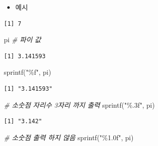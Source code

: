 \documentclass[
  11pt,
]{krantz}
\newenvironment{Shaded}{\begin{snugshade}}{\end{snugshade}}
\newcommand{\CommentTok}[1]{\textcolor[rgb]{0.37,0.37,0.37}{\textit{#1}}}
\newcommand{\FunctionTok}[1]{\textcolor[rgb]{0,0,0}{#1}}
\newcommand{\NormalTok}[1]{#1}
\newcommand{\SpecialCharTok}[1]{\textcolor[rgb]{0,0,0}{#1}}
\newcommand{\StringTok}[1]{\textcolor[rgb]{0.5,0.5,0.5}{#1}}
\providecommand{\tightlist}{%
  \setlength{\itemsep}{0pt}\setlength{\parskip}{0pt}}
\begin{document}
\normalsize

\begin{itemize}
\tightlist
\item
  예시
\end{itemize}

\footnotesize

\begin{Shaded}
\end{Shaded}

\begin{verbatim}
[1] 7
\end{verbatim}

\begin{Shaded}
\begin{Highlighting}[]
\NormalTok{pi }\CommentTok{\# 파이 값}
\end{Highlighting}
\end{Shaded}

\begin{verbatim}
[1] 3.141593
\end{verbatim}

\begin{Shaded}
\begin{Highlighting}[]
\FunctionTok{sprintf}\NormalTok{(}\StringTok{"\%f"}\NormalTok{, pi) }
\end{Highlighting}
\end{Shaded}

\begin{verbatim}
[1] "3.141593"
\end{verbatim}

\begin{Shaded}
\begin{Highlighting}[]
\CommentTok{\# 소숫점 자리수 3자리 까지 출력}
\FunctionTok{sprintf}\NormalTok{(}\StringTok{"\%.3f"}\NormalTok{, pi)}
\end{Highlighting}
\end{Shaded}

\begin{verbatim}
[1] "3.142"
\end{verbatim}

\begin{Shaded}
\begin{Highlighting}[]
\CommentTok{\# 소숫점 출력 하지 않음}
\FunctionTok{sprintf}\NormalTok{(}\StringTok{"\%1.0f"}\NormalTok{, pi)}
\end{Highlighting}
\end{Shaded}
\end{document}
